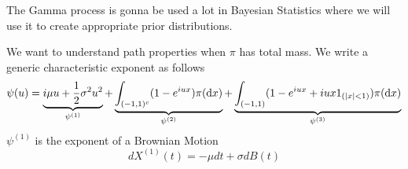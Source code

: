 \documentclass{article}
\begin{document}
	\begin{remark}
		The Gamma process is gonna be used a lot in Bayesian Statistics where we will use it to create appropriate prior distributions. 
	\end{remark}
	We want to understand path properties when $\pi$ has total mass. We write a generic characteristic exponent as follows
	\begin{equation*}
		\psi(u)  = \underbrace{i\mu u + \frac{1}{2}\sigma^2 u^2}_{\psi^{(1)}} + \underbrace{\int_{(-1,1)^c}(1-e^{iux})\pi(\mathop{}\!\mathrm{d} x)}_{\psi^{(2)}} + \underbrace{\int_{(-1,1)}(1-e^{iux} + iux 1_{(|x|<1)})\pi(\mathop{}\!\mathrm{d} x)}_{\psi^{(3)}}
	\end{equation*}
	$\psi^{(1)}$ is the exponent of a Brownian Motion
	\begin{equation*}
		d X^{(1)}(t) = - \mu dt + \sigma dB(t) 
	\end{equation*}
\end{document}

